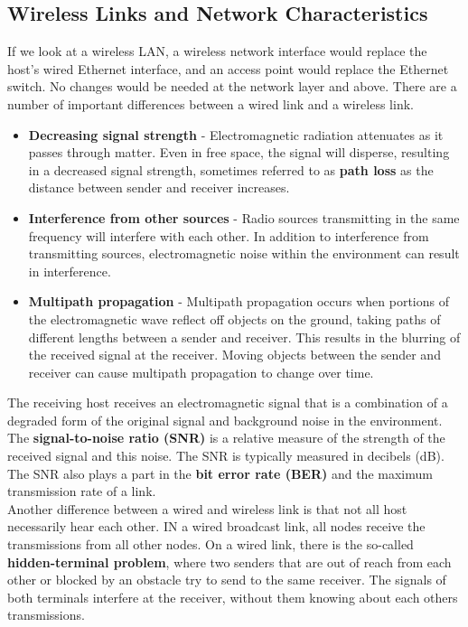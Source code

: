 \subsection{Wireless Links and Network Characteristics}
If we look at a wireless LAN, a wireless network interface would replace the host's wired Ethernet interface, and an access point would replace the Ethernet switch. No changes would be needed at the network layer and above. There are a number of important differences between a wired link and a wireless link.
\begin{itemize}
\item \textbf{Decreasing signal strength} - Electromagnetic radiation attenuates as it passes through matter. Even in free space, the signal will disperse, resulting in a decreased signal strength, sometimes referred to as \textbf{path loss} as the distance between sender and receiver increases. 
\item \textbf{Interference from other sources} - Radio sources transmitting in the same frequency will interfere with each other. In addition to interference from transmitting sources, electromagnetic noise within the environment can result in interference.
\item \textbf{Multipath propagation} - Multipath propagation occurs when portions of the electromagnetic wave reflect off objects on the ground, taking paths of different lengths between a sender and receiver. This results in the blurring of the received signal at the receiver. Moving objects between the sender and receiver can cause multipath propagation to change over time.
\end{itemize}
The receiving host receives an electromagnetic signal that is a combination of a degraded form of the original signal and background noise in the environment. The \textbf{signal-to-noise ratio (SNR)} is a relative measure of the strength of the received signal and this noise. The SNR is typically measured in decibels (dB). The SNR also plays a part in the \textbf{bit error rate (BER)} and the maximum transmission rate of a link.\vspace{.3cm}\\

Another difference between a wired and wireless link is that not all host necessarily hear each other. IN a wired broadcast link, all nodes receive the transmissions from all other nodes. On a wired link, there is the so-called \textbf{hidden-terminal problem}, where two senders that are out of reach from each other or blocked by an obstacle try to send to the same receiver. The signals of both terminals interfere at the receiver, without them knowing about each others transmissions.

